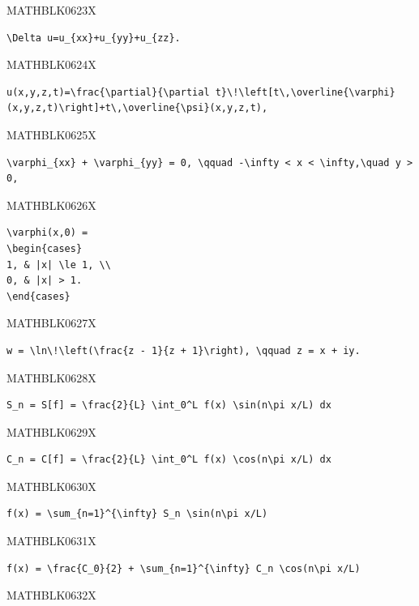 \documentclass[
  ukrainian,
]{article}
\begin{document}
MATHBLK0623X

\begin{verbatim}
\Delta u=u_{xx}+u_{yy}+u_{zz}.
\end{verbatim}

MATHBLK0624X

\begin{verbatim}
u(x,y,z,t)=\frac{\partial}{\partial t}\!\left[t\,\overline{\varphi}(x,y,z,t)\right]+t\,\overline{\psi}(x,y,z,t),
\end{verbatim}

MATHBLK0625X

\begin{verbatim}
\varphi_{xx} + \varphi_{yy} = 0, \qquad -\infty < x < \infty,\quad y > 0,
\end{verbatim}

MATHBLK0626X

\begin{verbatim}
\varphi(x,0) =
\begin{cases}
1, & |x| \le 1, \\
0, & |x| > 1.
\end{cases}
\end{verbatim}

MATHBLK0627X

\begin{verbatim}
w = \ln\!\left(\frac{z - 1}{z + 1}\right), \qquad z = x + iy.
\end{verbatim}

MATHBLK0628X

\begin{verbatim}
S_n = S[f] = \frac{2}{L} \int_0^L f(x) \sin(n\pi x/L) dx
\end{verbatim}

MATHBLK0629X

\begin{verbatim}
C_n = C[f] = \frac{2}{L} \int_0^L f(x) \cos(n\pi x/L) dx
\end{verbatim}

MATHBLK0630X

\begin{verbatim}
f(x) = \sum_{n=1}^{\infty} S_n \sin(n\pi x/L)
\end{verbatim}

MATHBLK0631X

\begin{verbatim}
f(x) = \frac{C_0}{2} + \sum_{n=1}^{\infty} C_n \cos(n\pi x/L)
\end{verbatim}

MATHBLK0632X
\end{document}
